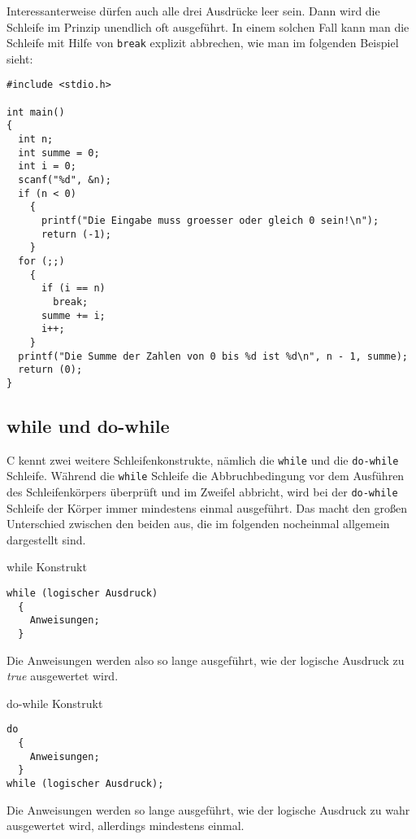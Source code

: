 Interessanterweise dürfen auch alle drei Ausdrücke leer sein.
Dann wird die Schleife im Prinzip unendlich oft ausgeführt.
In einem solchen Fall kann man die Schleife mit Hilfe von \verb|break| explizit abbrechen, wie man im folgenden Beispiel sieht:
\begin{lstlisting}
#include <stdio.h>

int main()
{
  int n;
  int summe = 0;
  int i = 0;
  scanf("%d", &n);
  if (n < 0)
    {
      printf("Die Eingabe muss groesser oder gleich 0 sein!\n");
      return (-1);
    }
  for (;;)
    {
      if (i == n)
        break;
      summe += i;
      i++;
    }
  printf("Die Summe der Zahlen von 0 bis %d ist %d\n", n - 1, summe);
  return (0);
}
\end{lstlisting}

\subsection{while und do-while}

C kennt zwei weitere Schleifenkonstrukte, nämlich die \verb|while| und die \verb|do-while| Schleife.
Während die \verb|while| Schleife die Abbruchbedingung vor dem Ausführen des Schleifenkörpers überprüft und im Zweifel abbricht, wird bei der \verb|do-while| Schleife der Körper immer mindestens einmal ausgeführt.
Das macht den großen Unterschied zwischen den beiden aus, die im folgenden nocheinmal allgemein dargestellt sind.
\begin{myalertblock}{while Konstrukt}
\begin{lstlisting}
while (logischer Ausdruck)
  {
    Anweisungen;
  }
\end{lstlisting}
\vspace{-0.5cm}
Die Anweisungen werden also so lange ausgeführt, wie der logische Ausdruck zu \emph{true} ausgewertet wird.
\end{myalertblock}

\begin{myalertblock}{do-while Konstrukt}
\begin{lstlisting}
do
  {
    Anweisungen;
  }
while (logischer Ausdruck);
\end{lstlisting}
\vspace{-0.5cm}
Die Anweisungen werden so lange ausgeführt, wie der logische Ausdruck zu wahr ausgewertet wird, allerdings mindestens einmal.
\end{myalertblock}

\endinput
